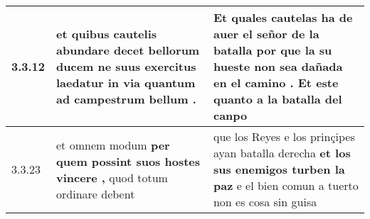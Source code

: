 \begin{tabular}{|p{1cm}|p{6.5cm}|p{6.5cm}|}
3.3.12 & et quibus cautelis abundare decet bellorum ducem \textbf{ ne suus exercitus laedatur } in via quantum ad campestrum bellum . & Et quales cautelas ha de auer el señor de la batalla \textbf{ por que la su hueste non sea dañada en el camino . } Et este quanto a la batalla del canpo \\\hline
3.3.23 & et omnem modum \textbf{ per quem possint suos hostes vincere , } quod totum ordinare debent & que los Reyes e los prinçipes ayan batalla derecha \textbf{ et los sus enemigos turben la paz } e el bien comun a tuerto non es cosa sin guisa \\\hline

\end{tabular}
